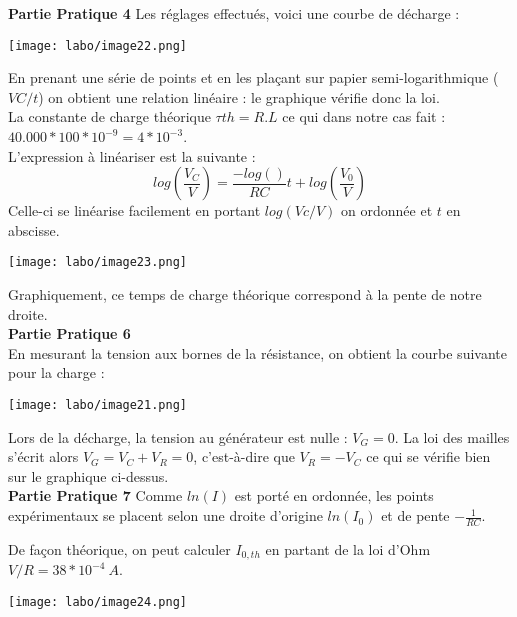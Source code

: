 \documentclass[british,french,11pt, a4paper, openany]{book}
\begin{document}
		\textbf{Partie Pratique 4}
		Les réglages effectués, voici une courbe de décharge : 
		\begin{center}
			\texttt{[image: labo/image22.png]}
		\end{center}
		En prenant une série de points et en les plaçant sur papier semi-logarithmique ($VC/t$) on obtient une relation linéaire : le graphique vérifie donc la loi.\\
		La constante de charge théorique $\tau{th} = R.L$ ce qui dans notre cas fait : $40.000 * 100 * 10^{-9} = 4*10^{-3}$.\\
		L'expression à linéariser est la suivante : 
		\begin{equation}
			log\left(\frac{V_C}{V}\right) = \frac{-log()}{RC}t + log\left(\frac{V_0}{V}\right)
		\end{equation}
		Celle-ci se linéarise facilement en portant $log(Vc/V)$ on ordonnée et $t$ en abscisse.
		\begin{center}
			\texttt{[image: labo/image23.png]}
		\end{center}
		Graphiquement, ce temps de charge théorique correspond à la pente de notre droite.\\
		
		\textbf{Partie Pratique 6}\\
		En mesurant la tension aux bornes de la résistance, on obtient la courbe suivante pour la charge :
		\begin{center}
			\texttt{[image: labo/image21.png]}
		\end{center}
		Lors de la décharge, la tension au générateur est nulle : $V_G = 0$. La loi des mailles s'écrit alors $V_G = V_C + V_R = 0$, c'est-à-dire que $V_R = - V_C$ ce qui se vérifie bien sur le graphique ci-dessus.\\
		
		\textbf{Partie Pratique 7}
		Comme $ln(I)$ est porté en ordonnée, les points expérimentaux se placent selon une droite d'origine $ln(I_0)$ et de pente $-\frac{1}{RC}$.
		
		De façon théorique, on peut calculer $I_{0, th}$ en partant de la loi d'Ohm $V/R = 38*10^{-4}\ A$.
		\begin{center}
			\texttt{[image: labo/image24.png]}
		\end{center}
		
\end{document}
